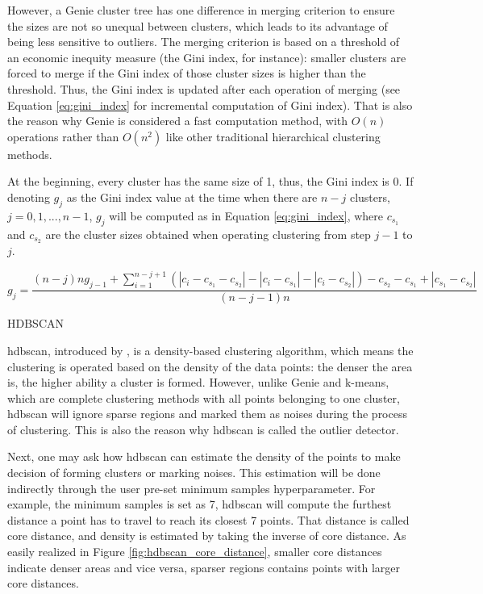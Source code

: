 \documentclass[a4paper,man,floatsintext,natbib,noextraspace]{apa6}
\makeatletter
\renewcommand{\subsubsection}{\@startsection{subsubsection}{3}
  {\z@}
  {\b@level@two@skip}
  {\e@level@two@skip}
  {\normalfont\normalsize\bfseries\itshape}}
\makeatother
\begin{document}
However, a Genie cluster tree has one difference in merging criterion to ensure the sizes are not so unequal between clusters, which leads to its advantage of being less sensitive to outliers. The merging criterion is based on a threshold of an economic inequity measure (the Gini index, for instance): smaller clusters are forced to merge if the Gini index of those cluster sizes is higher than the threshold. Thus, the Gini index is updated after each operation of merging (see Equation \eqref{eq:gini_index} for incremental computation of Gini index). That is also the reason why Genie is considered a fast computation method, with $O(n)$ operations rather than $O(n^{2})$ like other traditional hierarchical clustering methods.

At the beginning, every cluster has the same size of 1, thus, the Gini index is 0. If denoting $g_{j}$ as the Gini index value at the time when there are $n − j$ clusters, $j = 0, 1, ..., n − 1$, $g_{j}$ will be computed as in Equation \eqref{eq:gini_index}, where $c_{s_{1}}$ and $c_{s_{2}}$ are the cluster sizes obtained when operating clustering from step $j-1$ to $j$.

\begin{equation}\label{eq:gini_index}
    g_{j} = \dfrac{(n-j)ng_{j-1} + \sum_{i=1}^{n-j+1} (|c_{i} - c_{s_{1}} - c_{s_{2}}| - |c_{i} - c_{s_{1}}| - |c_{i} - c_{s_{2}}|) - c_{s_{2}} - c_{s_{1}} + |c_{s_{1}} - c_{s_{2}}|}{(n-j-1)n}
\end{equation}

\subsubsection{HDBSCAN}

\gls{hdbscan}, introduced by \cite{campelloDensitybasedClusteringBased2013}, is a density-based clustering algorithm, which means the clustering is operated based on the density of the data points: the denser the area is, the higher ability a cluster is formed. However, unlike Genie and k-means, which are complete clustering methods with all points belonging to one cluster, \gls{hdbscan} will ignore sparse regions and marked them as noises during the process of clustering. This is also the reason why \gls{hdbscan} is called the outlier detector. 

Next, one may ask how \gls{hdbscan} can estimate the density of the points to make decision of forming clusters or marking noises. This estimation will be done indirectly through the user pre-set minimum samples hyperparameter. For example, the minimum samples is set as 7, \gls{hdbscan} will compute the furthest distance a point has to travel to reach its closest 7 points. That distance is called core distance, and density is estimated by taking the inverse of core distance. As easily realized in Figure \ref{fig:hdbscan_core_distance}, smaller core distances indicate denser areas and vice versa, sparser regions contains points with larger core distances.
\end{document}
